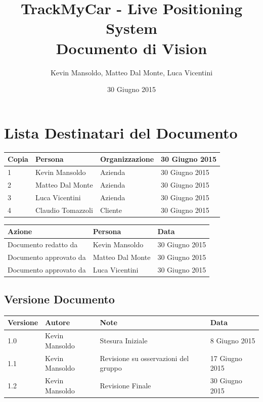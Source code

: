 \documentclass[a4paper,12pt]{article}
\begin{document}
\title{\textbf{TrackMyCar - Live Positioning System} \\ Documento di Vision}

\author{Kevin Mansoldo, Matteo Dal Monte, Luca Vicentini}
\date{30 Giugno 2015}
\maketitle
\pagebreak

\tableofcontents
\pagebreak

\section{Lista Destinatari del Documento}

\begin{table}[ht]
\begin{center}
\begin{tabular}{p{1cm} p{4.5cm} p{3.5cm} p{3.5cm}}
\rowcolor{Ash}
\hline
Copia & Persona & Organizzazione & 30 Giugno 2015 \\ \hline
1 & Kevin Mansoldo & Azienda & 30 Giugno 2015 \\ 
2 & Matteo Dal Monte & Azienda & 30 Giugno 2015 \\ 
3 & Luca Vicentini & Azienda & 30 Giugno 2015 \\ 
4 & Claudio Tomazzoli & Cliente & 30 Giugno 2015 \\ \hline
\end{tabular}
\end{center}


\begin{center}
\begin{tabular}{p{6cm} p{3.5cm} p{3.5cm}}
\rowcolor{Ash}
\hline
Azione & Persona & Data \\ \hline
Documento redatto da & Kevin Mansoldo & 30 Giugno 2015 \\ 
Documento approvato da & Matteo Dal Monte & 30 Giugno 2015 \\ 
Documento approvato da & Luca Vicentini & 30 Giugno 2015 \\ \hline
\end{tabular}
\end{center}
\end{table}

\subsection{Versione Documento}
\begin{table}[ht]
\begin{center}
\begin{tabular}{p{1cm} p{3cm} p{5cm} p{3.5cm}}
\rowcolor{Ash}
\hline
Versione & Autore & Note & Data \\ \hline
1.0 & Kevin Mansoldo & Stesura Iniziale & 8 Giugno 2015 \\ 
1.1 & Kevin Mansoldo & Revisione su osservazioni del gruppo & 17 Giugno 2015 \\ 
1.2 & Kevin Mansoldo & Revisione Finale & 30 Giugno 2015 \\ \hline
\end{tabular}
\end{center}
\end{table}
\end{document}
